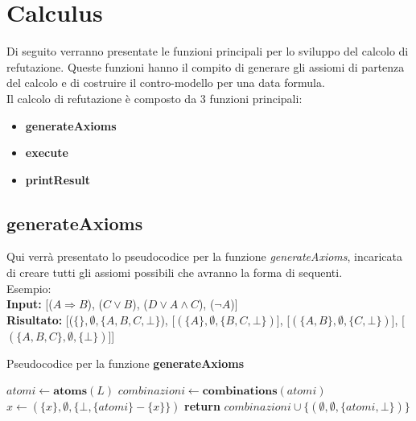 \documentclass[\main/tesi.tex]{subfiles}
\begin{document}
\newpage

\section{Calculus}

Di seguito verranno presentate le funzioni principali per lo sviluppo del calcolo di refutazione. Queste funzioni hanno il compito di generare gli assiomi di partenza del calcolo e di costruire il contro-modello per una data formula. \\

Il calcolo di refutazione è composto da 3 funzioni principali:
\begin{itemize}
    \item \textbf{generateAxioms}
    \item \textbf{execute}
    \item \textbf{printResult}
\end{itemize}

\subsection{generateAxioms}
Qui verrà presentato lo pseudocodice per la funzione \textit{generateAxioms}, incaricata di creare tutti gli assiomi possibili che avranno la forma di sequenti. \\
Esempio: \\
\textbf{Input:} [($A \Rightarrow B$), ($C \lor B$), ($D \lor A \land C$), ($\neg A$)] \\
\textbf{Risultato:} [($\{\}, \emptyset, \{A, B, C, \bot\}$), [$(\{A\}, \emptyset, \{B, C, \bot\})$], [$(\{A, B\}, \emptyset, \{C, \bot\})$], [$(\{A, B, C\}, \emptyset, \{\bot\})$]]

\begin{algorithm}
    \caption{Pseudocodice per la funzione \textbf{generateAxioms}}\label{alg:generateAxioms}
    \begin{algorithmic}
        \State $atomi \gets \textbf{atoms}(L)$
        \State $combinazioni \gets \textbf{combinations}(atomi)$
        \State $x \gets (\{x\}, \emptyset, \{\bot, \{atomi\} - \{x\}\})$
        \EndFor
        \State \textbf{return} $combinazioni \cup \{(\emptyset, \emptyset, \{atomi, \bot\})\}$
        \EndFunction
    \end{algorithmic}
\end{algorithm}

\newpage
\end{document}
